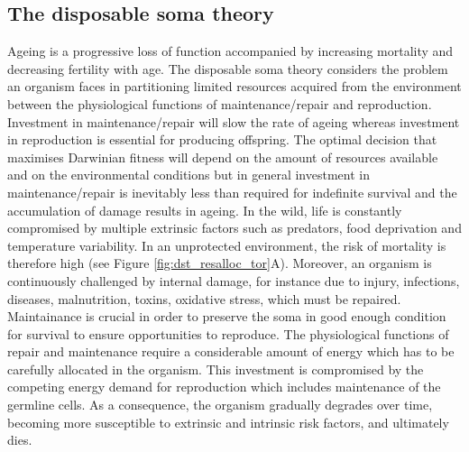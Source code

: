 \subsection{The disposable soma theory}
\label{subsec:The disposable soma theory}
Ageing is a progressive loss of function accompanied by increasing mortality and decreasing fertility with age. The disposable soma theory \citep{Kirkwood1977, Kirkwood1981, Kirkwood1991, FinchKirkwood_book2000, Shanley2000} considers the problem an organism faces in partitioning limited resources acquired from the environment between the physiological functions of maintenance/repair and reproduction. Investment in maintenance/repair will slow the rate of ageing whereas investment in reproduction is essential for producing offspring. The optimal decision that maximises Darwinian fitness will depend on the amount of resources available and on the environmental conditions but in general investment in maintenance/repair is inevitably less than required for indefinite survival and the accumulation of damage results in ageing. In the wild, life is constantly compromised by multiple extrinsic factors such as predators, food deprivation and temperature variability. In an unprotected environment, the risk of 
mortality is therefore high (see Figure \ref{fig:dst_resalloc_tor}A). Moreover, an organism is continuously challenged by internal damage, for instance due to injury, infections, diseases, malnutrition, toxins, oxidative stress, which must be repaired. Maintainance is crucial in order to preserve the soma in good enough condition for survival to ensure opportunities to reproduce. The physiological functions of repair and maintenance require a considerable amount of energy which has to be carefully allocated in the organism. This investment is compromised by the competing energy demand for reproduction which includes maintenance of the germline cells. As a consequence, the organism gradually degrades over time, becoming more susceptible to extrinsic and intrinsic risk factors, and ultimately dies.

